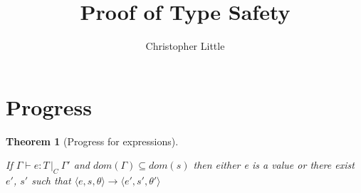 \documentclass[a4paper]{article}
\theoremstyle{dotless}
\newtheorem{theorem}{Theorem}[section]
\theoremstyle{case}
\theoremstyle{subcase}
\begin{document}
\title{Proof of Type Safety}
\author{Christopher Little}
\maketitle

\section{Progress}
	\newcommand{\typable}[2][ ]{\Gamma{}\vdash#2\, |C#1\:\Gamma#1'}
	\newcommand{\typed}[2]{\Gamma{}\vdash#1: #2\,|_C\:\Gamma'}
	\newcommand{\transition}[6]{\langle{}#1,#2,#3\rangle{}\rightarrow{}\langle{}#4,#5,#6\rangle}
	\newcommand{\indHyp}{\Phi(\Gamma, m, C, \Gamma')}
	\newcommand{\indHypTwo}{\Psi(\Gamma, e, T, C, \Gamma')}
	\newcommand{\var}{\textbf{var}}
	\newcommand{\sub}[1]{\textsubscript{#1}}

	\begin{theorem}[Progress for expressions]\label{expProgress}

      If $\typed{e}{T}$ and $dom(\Gamma) \subseteq dom(s)$ then either e is a
      value or there exist $e'$, $s'$ such that $\transition{e}{s}{\theta}{e'}{s'}{\theta'}$
      
    \end{theorem}
\end{document}
